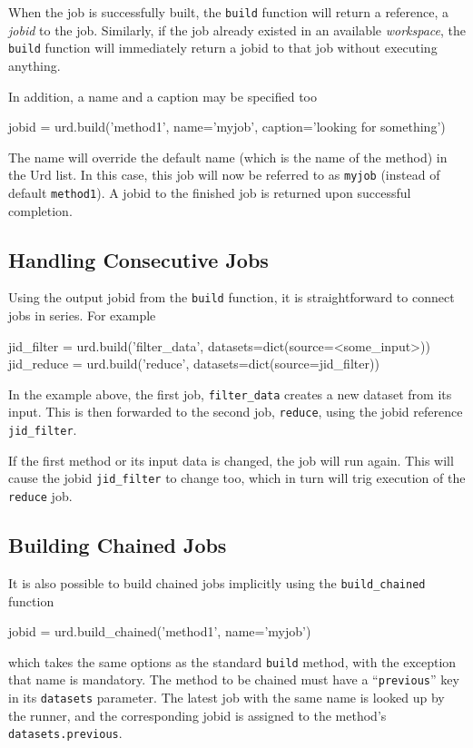 When the job is successfully built, the \texttt{build} function will
return a reference, a \textsl{jobid} to the job.  Similarly, if the
job already existed in an available \textsl{workspace}, the
\texttt{build} function will immediately return a jobid to that job
without executing anything.


In addition, a name and a caption may be specified too
\begin{python}
jobid = urd.build('method1', name='myjob', caption='looking for something')
\end{python}
The name will override the default name (which is the name of the
method) in the Urd list.  In this case, this job will now be referred
to as \texttt{myjob} (instead of default \texttt{method1}).  A jobid
to the finished job is returned upon successful completion.



\subsection{Handling Consecutive Jobs}
Using the output jobid from the \texttt{build} function, it is
straightforward to connect jobs in series.  For example
\begin{python}
jid_filter = urd.build('filter_data', datasets=dict(source=<some_input>))
jid_reduce = urd.build('reduce', datasets=dict(source=jid_filter))
\end{python}
In the example above, the first job, \texttt{filter\_data} creates a
new dataset from its input.  This is then forwarded to the second job,
\texttt{reduce}, using the jobid reference \texttt{jid\_filter}.

If the first method or its input data is changed, the job will run
again.  This will cause the jobid \texttt{jid\_filter} to change too,
which in turn will trig execution of the \texttt{reduce} job.



\subsection{Building Chained Jobs}
It is also possible to build chained jobs implicitly using the
\texttt{build\_chained} function
\begin{python}
jobid = urd.build_chained('method1', name='myjob')
\end{python}
which takes the same options as the standard \texttt{build} method,
with the exception that name is mandatory.  The method to be chained
must have a ``\texttt{previous}'' key in its \texttt{datasets}
parameter.  The latest job with the same name is looked up by the
runner, and the corresponding jobid is assigned to the
method's \texttt{datasets.previous}.




